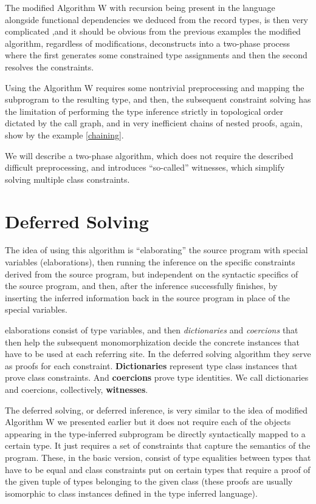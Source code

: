 \begin{observe}
    The modified Algorithm W with recursion being present in the language alongside functional dependencies we deduced from the record types, is then very complicated ,and it should be obvious from the previous examples the modified algorithm, regardless of modifications, deconstructs into a two-phase process where the first generates some constrained type assignments and then the second resolves the constraints.
\end{observe}

Using the Algorithm W requires some nontrivial preprocessing and mapping the subprogram to the resulting type, and then, the subsequent constraint solving has the limitation of performing the type inference strictly in topological order dictated by the call graph, and in very inefficient chains of nested proofs, again, show by the example \ref{chaining}.

We will describe a two-phase algorithm, which does not require the described difficult preprocessing, and introduces ``so-called'' witnesses, which simplify solving multiple class constraints.

\section{Deferred Solving}
\label{defer_solve}

The idea of using this algorithm is ``elaborating'' the source program with special variables (elaborations), then running the inference on the specific constraints derived from the source program, but independent on the syntactic specifics of the source program, and then, after the inference successfully finishes, by inserting the inferred information back in the source program in place of the special variables.

elaborations consist of type variables, and then \textit{dictionaries} and \textit{coercions} that then help the subsequent monomorphization decide the concrete instances that have to be used at each referring site. In the deferred solving algorithm they serve as proofs for each constraint. \textbf{Dictionaries} represent type class instances that prove class constraints. And \textbf{coercions} prove type identities. We call dictionaries and coercions, collectively, \textbf{witnesses}.

The deferred solving, or deferred inference, is very similar to the idea of modified Algorithm W we presented earlier but it does not require each of the objects appearing in the type-inferred subprogram be directly syntactically mapped to a certain type. It just requires a set of constraints that capture the semantics of the program. These, in the basic version, consist of type equalities between types that have to be equal and class constraints put on certain types that require a proof of the given tuple of types belonging to the given class (these proofs are usually isomorphic to class instances defined in the type inferred language).

